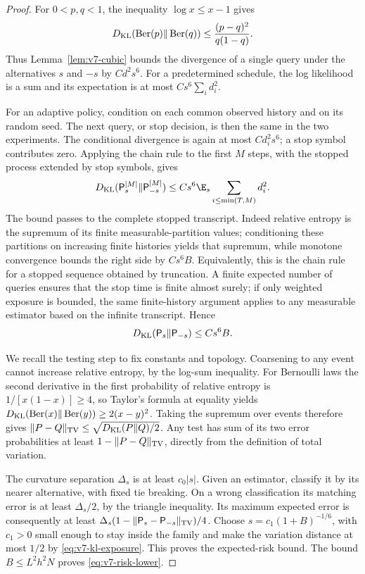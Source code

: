\begin{proof}
For $0<p,q<1$, the inequality $\log x\le x-1$ gives
\[
 D_{\rm KL}(\operatorname{Ber}(p)\Vert\operatorname{Ber}(q))
 \le \frac{(p-q)^2}{q(1-q)}.
\]
Thus Lemma~\ref{lem:v7-cubic} bounds the divergence of a single query
under the alternatives $s$ and $-s$ by $Cd^2s^6$. For a predetermined
schedule, the log likelihood is a sum and its expectation is at most
$Cs^6\sum_i d_i^2$.

For an adaptive policy, condition on each common observed history and
on its random seed. The next query, or stop decision, is then the same
in the two experiments. The conditional divergence is again at most
$Cd_i^2s^6$; a stop symbol contributes zero. Applying the chain rule
to the first $M$ steps, with the stopped process extended by stop
symbols, gives
\[
 D_{\rm KL}(\mathsf P_s^{[M]}\Vert\mathsf P_{-s}^{[M]})
     \le Cs^6\E_s\sum_{i\le\min(T,M)}d_i^2.
\]
The bound passes to the complete stopped transcript. Indeed relative
entropy is the supremum of its finite measurable-partition values;
conditioning these partitions on increasing finite histories yields
that supremum, while monotone convergence bounds the right side by
$Cs^6B$. Equivalently, this is the chain rule for a stopped sequence
obtained by truncation. A finite expected number of queries ensures
that the stop time is finite almost surely; if only weighted exposure
is bounded, the same finite-history argument applies to any measurable
estimator based on the infinite transcript. Hence
\begin{equation}\label{eq:v7-kl-exposure}
 D_{\rm KL}(\mathsf P_s\Vert\mathsf P_{-s})\le Cs^6B.
\end{equation}

We recall the testing step to fix constants and topology. Coarsening
to any event cannot increase relative entropy, by the log-sum
inequality. For Bernoulli laws the second derivative in the first
probability of relative entropy is $1/[x(1-x)]\ge4$, so Taylor's
formula at equality yields $D_{\rm KL}(\operatorname{Ber}(x)\Vert
\operatorname{Ber}(y))\ge2(x-y)^2$. Taking the supremum over events
therefore gives
$\|P-Q\|_{\rm TV}\le\sqrt{D_{\rm KL}(P\Vert Q)/2}$.
Any test has sum of its two error probabilities at least
$1-\|P-Q\|_{\rm TV}$, directly from the definition of total variation.

The curvature separation $\Delta_s$ is at least $c_0|s|$. Given an
estimator, classify it by its nearer alternative, with fixed tie
breaking. On a wrong classification its matching error is at least
$\Delta_s/2$, by the triangle inequality. Its maximum expected error
is consequently at least
$\Delta_s(1-\|\mathsf P_s-\mathsf P_{-s}\|_{\rm TV})/4$.
Choose $s=c_1(1+B)^{-1/6}$, with $c_1>0$ small enough to stay inside
the family and make the variation distance at most $1/2$ by
\eqref{eq:v7-kl-exposure}. This proves the expected-risk bound.
The bound $B\le L^2h^2N$ proves \eqref{eq:v7-risk-lower}.


\end{proof}
